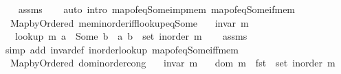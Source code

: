 \begin{isabellebody}
%
\isadelimproof
\ \ %
\endisadelimproof
%
\isatagproof
{}\isamarkupfalse%
\ assms\isanewline
\ \ \isamarkupfalse%
\ {\isacharparenleft}{\kern0pt}auto\ intro{\isacharcolon}{\kern0pt}\ map{\isacharunderscore}{\kern0pt}of{\isacharunderscore}{\kern0pt}eq{\isacharunderscore}{\kern0pt}Some{\isacharunderscore}{\kern0pt}imp{\isacharunderscore}{\kern0pt}mem\ map{\isacharunderscore}{\kern0pt}of{\isacharunderscore}{\kern0pt}eq{\isacharunderscore}{\kern0pt}Some{\isacharunderscore}{\kern0pt}if{\isacharunderscore}{\kern0pt}mem{\isacharparenright}{\kern0pt}%
\endisatagproof
{\isafoldproof}%
%
\isadelimproof
\isanewline
%
\endisadelimproof
\isanewline
{}\isamarkupfalse%
\ {\isacharparenleft}{\kern0pt}\ Map{\isacharunderscore}{\kern0pt}by{\isacharunderscore}{\kern0pt}Ordered{\isacharparenright}{\kern0pt}\ mem{\isacharunderscore}{\kern0pt}inorder{\isacharunderscore}{\kern0pt}iff{\isacharunderscore}{\kern0pt}lookup{\isacharunderscore}{\kern0pt}eq{\isacharunderscore}{\kern0pt}Some{\isacharcolon}{\kern0pt}\isanewline
\ \ \ {\isachardoublequoteopen}invar\ m{\isachardoublequoteclose}\isanewline
\ \ \ {\isachardoublequoteopen}lookup\ m\ a\ {\isacharequal}{\kern0pt}\ Some\ b\ {\isasymlongleftrightarrow}\ {\isacharparenleft}{\kern0pt}a{\isacharcomma}{\kern0pt}\ b{\isacharparenright}{\kern0pt}\ {\isasymin}\ set\ {\isacharparenleft}{\kern0pt}inorder\ m{\isacharparenright}{\kern0pt}{\isachardoublequoteclose}\isanewline
%
\isadelimproof
\ \ %
\endisadelimproof
%
\isatagproof
{}\isamarkupfalse%
\ assms\isanewline
\ \ \isamarkupfalse%
\ {\isacharparenleft}{\kern0pt}simp\ add{\isacharcolon}{\kern0pt}\ invar{\isacharunderscore}{\kern0pt}def\ inorder{\isacharunderscore}{\kern0pt}lookup\ map{\isacharunderscore}{\kern0pt}of{\isacharunderscore}{\kern0pt}eq{\isacharunderscore}{\kern0pt}Some{\isacharunderscore}{\kern0pt}iff{\isacharunderscore}{\kern0pt}mem{\isacharparenright}{\kern0pt}%
\endisatagproof
{\isafoldproof}%
%
\isadelimproof
\isanewline
%
\endisadelimproof
\isanewline
{}\isamarkupfalse%
\ {\isacharparenleft}{\kern0pt}\ Map{\isacharunderscore}{\kern0pt}by{\isacharunderscore}{\kern0pt}Ordered{\isacharparenright}{\kern0pt}\ dom{\isacharunderscore}{\kern0pt}inorder{\isacharunderscore}{\kern0pt}cong{\isacharcolon}{\kern0pt}\isanewline
\ \ \ {\isachardoublequoteopen}invar\ m{\isachardoublequoteclose}\isanewline
\ \ \ {\isachardoublequoteopen}dom\ m\ {\isacharequal}{\kern0pt}\ fst\ {\isacharbackquote}{\kern0pt}\ set\ {\isacharparenleft}{\kern0pt}inorder\ m{\isacharparenright}{\kern0pt}{\isachardoublequoteclose}\isanewline

\end{isabellebody}
